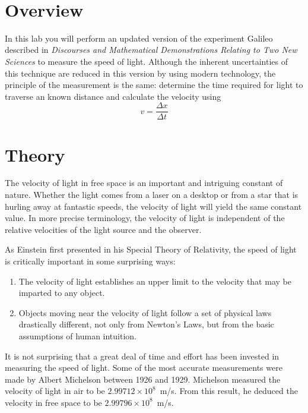 \documentclass{tufte-handout}
\begin{document}



\vspace{0.5cm}
\\
\vspace{0.5cm}


\section{Overview}

In this lab you will perform an updated version of the experiment Galileo
described in {\em Discourses and Mathematical Demonstrations Relating to Two New
  Sciences} to measure the speed of light.  Although the inherent uncertainties
of this technique are reduced in this version by using modern technology, the
principle of the measurement is the same: determine the time required for light
to traverse an known distance and calculate the velocity using
\[
v=\frac{\Delta x}{\Delta t}
\]


\section{Theory}

The velocity of light in free space is an important and intriguing 
constant of nature. Whether the light comes from a laser on a desktop 
or from a star that is hurling away at fantastic speeds, the velocity of 
light will yield the same constant value. In more precise terminology, 
the velocity of light is independent of the relative velocities of the light 
source and the observer. 

As Einstein first presented in his Special Theory of Relativity, the 
speed of light is critically important in some surprising ways: 
\begin{enumerate}
\item The velocity of light establishes an upper limit to the velocity that 
may be imparted to any object.
\item Objects moving near the velocity of light follow a set of physical 
laws drastically different, not only from Newton's Laws, but from 
the basic assumptions of human intuition.
\end{enumerate}

It is not surprising that a great deal of time and effort has been invested 
in measuring the speed of light. Some of the most accurate 
measurements were made by Albert Michelson between 1926 and 
1929. Michelson measured the velocity of light in air to be $2.99712\times10^8$~m/s. From this result, he deduced the velocity in free space to be $2.99796 \times 10^8$~m/s.
\end{document}
